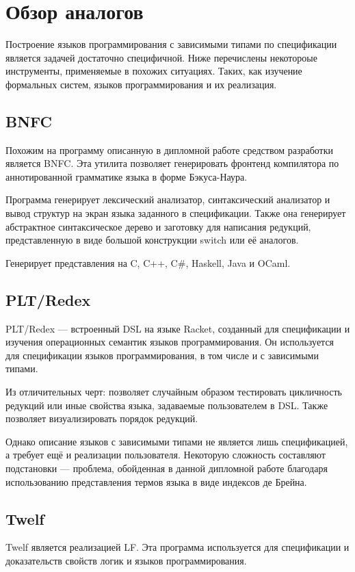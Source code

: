 \section{Обзор аналогов}
Построение языков программирования с зависимыми типами по спецификации является задачей достаточно специфичной. Ниже перечислены некотороые инструменты, применяемые в похожих ситуациях. Таких, как изучение формальных систем, языков программирования и их реализация.

\subsection{BNFC}
Похожим на программу описанную в дипломной работе средством разработки является BNFC\cite{bnfc}. Эта утилита позволяет генерировать фронтенд компилятора по аннотированной грамматике языка в форме Бэкуса-Наура\cite{lbnf}.

Программа генерирует лексический анализатор, синтаксический анализатор и вывод структур на экран языка заданного в спецификации. Также она генерирует абстрактное синтаксическое дерево и заготовку для написания редукций, представленную в виде большой конструкции switch или её аналогов.

Генерирует представления на C, C++, C\#, Haskell, Java и OCaml.

\subsection{PLT/Redex}
PLT/Redex\cite{plt:redex} --- встроенный DSL на языке Racket, созданный для спецификации и изучения операционных семантик языков программирования. Он используется для спецификации языков программирования, в том числе и с зависимыми типами.

Из отличительных черт: позволяет случайным образом тестировать цикличность редукций или иные свойства языка, задаваемые пользователем в DSL. Также позволяет визуализировать порядок редукций.

Однако описание языков с зависимыми типами не является лишь спецификацией, а требует ещё и реализации пользователя\cite{plt:ex}. Некоторую сложность составляют подстановки --- проблема, обойденная в данной дипломной работе благодаря использованию представления термов языка в виде индексов де Брейна.

\subsection{Twelf}
Twelf\cite{twelf} является реализацией LF\cite{Pfenning2002}. Эта программа используется для спецификации и доказательств свойств логик и языков программирования.


